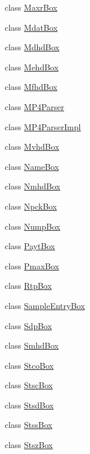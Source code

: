 \begin{DoxyCompactItemize}
\item 
class \mbox{\hyperlink{classmp4_parser_1_1_maxr_box}{Maxr\+Box}}
\item 
class \mbox{\hyperlink{classmp4_parser_1_1_mdat_box}{Mdat\+Box}}
\item 
class \mbox{\hyperlink{classmp4_parser_1_1_mdhd_box}{Mdhd\+Box}}
\item 
class \mbox{\hyperlink{classmp4_parser_1_1_mehd_box}{Mehd\+Box}}
\item 
class \mbox{\hyperlink{classmp4_parser_1_1_mfhd_box}{Mfhd\+Box}}
\item 
class \mbox{\hyperlink{classmp4_parser_1_1_m_p4_parser}{M\+P4\+Parser}}
\item 
class \mbox{\hyperlink{classmp4_parser_1_1_m_p4_parser_impl}{M\+P4\+Parser\+Impl}}
\item 
class \mbox{\hyperlink{classmp4_parser_1_1_mvhd_box}{Mvhd\+Box}}
\item 
class \mbox{\hyperlink{classmp4_parser_1_1_name_box}{Name\+Box}}
\item 
class \mbox{\hyperlink{classmp4_parser_1_1_nmhd_box}{Nmhd\+Box}}
\item 
class \mbox{\hyperlink{classmp4_parser_1_1_npck_box}{Npck\+Box}}
\item 
class \mbox{\hyperlink{classmp4_parser_1_1_nump_box}{Nump\+Box}}
\item 
class \mbox{\hyperlink{classmp4_parser_1_1_payt_box}{Payt\+Box}}
\item 
class \mbox{\hyperlink{classmp4_parser_1_1_pmax_box}{Pmax\+Box}}
\item 
class \mbox{\hyperlink{classmp4_parser_1_1_rtp_box}{Rtp\+Box}}
\item 
class \mbox{\hyperlink{classmp4_parser_1_1_sample_entry_box}{Sample\+Entry\+Box}}
\item 
class \mbox{\hyperlink{classmp4_parser_1_1_sdp_box}{Sdp\+Box}}
\item 
class \mbox{\hyperlink{classmp4_parser_1_1_smhd_box}{Smhd\+Box}}
\item 
class \mbox{\hyperlink{classmp4_parser_1_1_stco_box}{Stco\+Box}}
\item 
class \mbox{\hyperlink{classmp4_parser_1_1_stsc_box}{Stsc\+Box}}
\item 
class \mbox{\hyperlink{classmp4_parser_1_1_stsd_box}{Stsd\+Box}}
\item 
class \mbox{\hyperlink{classmp4_parser_1_1_stss_box}{Stss\+Box}}
\item 
class \mbox{\hyperlink{classmp4_parser_1_1_stsz_box}{Stsz\+Box}}

\end{DoxyCompactItemize}
